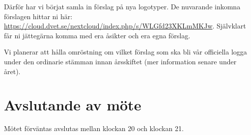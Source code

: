 \documentclass[protokoll]{dvd}
\begin{document}
Därför har vi börjat samla in förslag på nya logotyper.
De nuvarande inkomna förslagen hittar ni här: \url{https://cloud.dvet.se/nextcloud/index.php/s/WLGfd23XKLmMKJw}.
Självklart får ni jättegärna komma med era åsikter och era egna förslag.

Vi planerar att hålla omröstning om vilket förslag som ska bli vår officiella logga under den ordinarie stämman innan årsskiftet (mer information senare under året).

\section{Avslutande av möte}

Mötet förväntas avslutas mellan klockan 20 och klockan 21.

\end{document}
